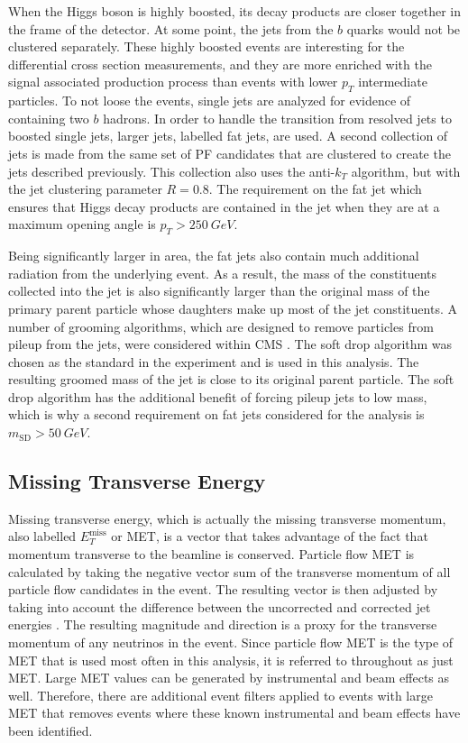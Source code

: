 When the Higgs boson is highly boosted, its decay products are closer together
in the frame of the detector.
At some point, the jets from the $b$ quarks would not be clustered separately.
These highly boosted events are interesting for the differential cross section measurements,
and they are more enriched with the signal associated production process than
events with lower $p_T$ intermediate particles.
To not loose the events, single jets are analyzed for evidence of containing two $b$ hadrons.
In order to handle the transition from resolved jets to boosted single jets,
larger jets, labelled fat jets, are used.
A second collection of jets is made from the same set of PF candidates that are
clustered to create the jets described previously.
This collection also uses the anti-$k_T$ algorithm,
but with the jet clustering parameter $R = 0.8$.
The requirement on the fat jet which ensures that Higgs decay products are contained
in the jet when they are at a maximum opening angle is $p_T > \SI{250}{GeV}$.

Being significantly larger in area,
the fat jets also contain much additional radiation from the underlying event.
As a result, the mass of the constituents collected into the jet
is also significantly larger than the original mass of the primary parent particle
whose daughters make up most of the jet constituents.
A number of grooming algorithms,
which are designed to remove particles from pileup from the jets,
were considered within CMS \cite{dabercro2014}.
The soft drop algorithm \cite{Larkoski_2014} was chosen as the standard in the experiment
and is used in this analysis.
The resulting groomed mass of the jet is close to its original parent particle.
The soft drop algorithm has the additional benefit of forcing pileup jets to low mass,
which is why a second requirement on fat jets considered for the analysis is
$m_\mathrm{SD} > \SI{50}{GeV}$.

\subsection{Missing Transverse Energy}

Missing transverse energy, which is actually the missing transverse momentum,
also labelled $E_T^\mathrm{miss}$ or MET,
is a vector that takes advantage of the fact that momentum
transverse to the beamline is conserved.
Particle flow MET is calculated by taking the negative vector sum of the
transverse momentum of all particle flow candidates in the event.
The resulting vector is then adjusted by taking into account the difference
between the uncorrected and corrected jet energies \cite{collaboration_2015}.
The resulting magnitude and direction is a proxy for the transverse momentum of
any neutrinos in the event.
Since particle flow MET is the type of MET that is used most often in this analysis,
it is referred to throughout as just MET.
Large MET values can be generated by instrumental and beam effects as well.
Therefore, there are additional event filters applied to events with large MET
that removes events where these known instrumental and beam effects have been identified.

